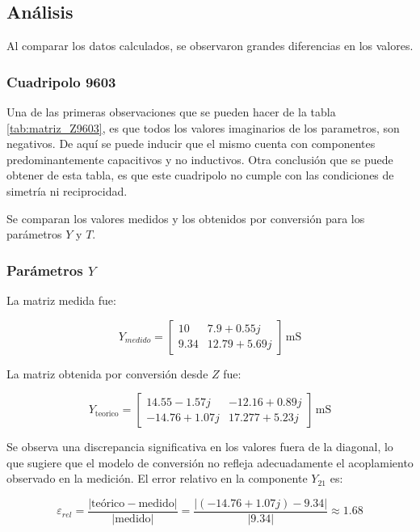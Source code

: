 \subsection{Análisis}

Al comparar los datos calculados, se observaron grandes diferencias en los valores. 

\subsubsection{Cuadripolo 9603}


Una de las primeras observaciones que se pueden hacer de la tabla \ref{tab:matriz_Z9603}, es que todos los valores imaginarios de los parametros, son negativos. De aquí se puede inducir que el mismo cuenta con componentes predominantemente capacitivos y no inductivos. Otra conclusión que se puede obtener de esta tabla, es que este cuadripolo no cumple con las condiciones de simetría ni reciprocidad.

Se comparan los valores medidos y los obtenidos por conversión para los parámetros $Y$ y $T$.

\subsubsection*{Parámetros $Y$}

La matriz medida fue:


\[
Y_{medido} =
\begin{bmatrix}
10 & 7.9 + 0.55j \\
9.34 & 12.79 + 5.69j
\end{bmatrix} \,\mathrm{mS}
\]



La matriz obtenida por conversión desde $Z$ fue:


\[
Y_{\mathrm{teorico}} =
\begin{bmatrix}
14.55 - 1.57j & -12.16 + 0.89j \\
-14.76 + 1.07j & 17.277 + 5.23j
\end{bmatrix} \,\mathrm{mS}
\]



Se observa una discrepancia significativa en los valores fuera de la diagonal, lo que sugiere que el modelo de conversión no refleja adecuadamente el acoplamiento observado en la medición. El error relativo en la componente $Y_{21}$ es:



\[
\varepsilon_{rel} = \frac{|\text{teórico} - \text{medido}|}{|\text{medido}|} = \frac{|(-14.76 + 1.07j) - 9.34|}{|9.34|} \approx 1.68
\]



